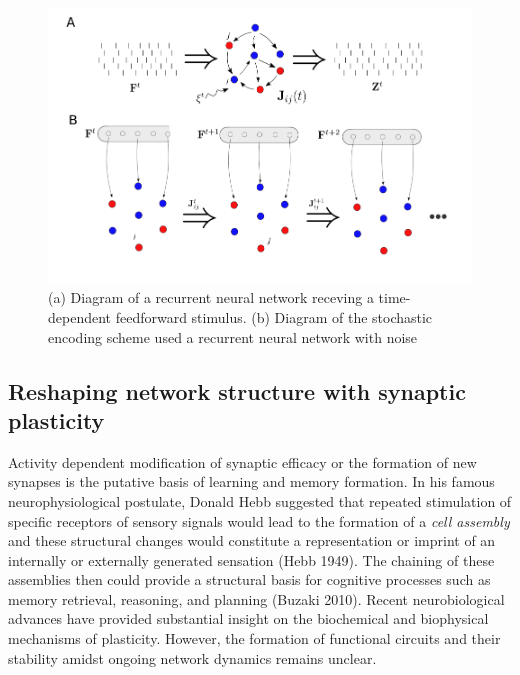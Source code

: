 \documentclass{ucetd}
\begin{document}
\begin{figure}[t!]
\centering
\includegraphics[width=150mm]{figure-1}
\caption{(a) Diagram of a recurrent neural network receving a time-dependent feedforward stimulus. (b) Diagram of the stochastic encoding scheme used a recurrent neural network with noise}
\end{figure}


\subsection{Reshaping network structure with synaptic plasticity}

Activity dependent modification of synaptic efficacy or the formation of new synapses is the putative basis of learning and memory formation. In his famous neurophysiological postulate, Donald Hebb suggested that repeated stimulation of specific receptors of sensory signals would lead to the formation of a \emph{cell assembly} and these structural changes would constitute a representation or imprint of an internally or externally generated sensation (Hebb 1949). The chaining of these assemblies then could provide a structural basis for cognitive processes such as memory retrieval, reasoning, and planning (Buzaki 2010). Recent neurobiological advances have provided substantial insight on the biochemical and biophysical mechanisms of plasticity. However, the formation of functional circuits and their stability amidst ongoing network dynamics remains unclear.
\end{document}
